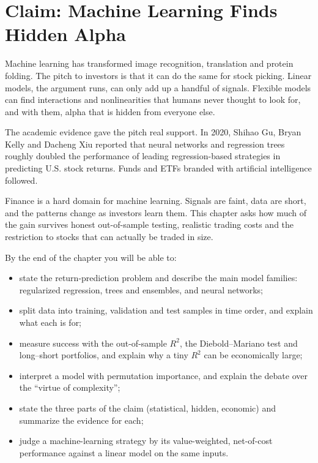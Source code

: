 \makeatletter
{}
\makeatother

\chapter{Claim: Machine Learning Finds Hidden Alpha}
\label{ch:21}

Machine learning has transformed image recognition, translation and protein folding. The pitch to investors is that it can do the same for stock picking. Linear models, the argument runs, can only add up a handful of signals. Flexible models can find interactions and nonlinearities that humans never thought to look for, and with them, alpha that is hidden from everyone else.

The academic evidence gave the pitch real support. In 2020, Shihao Gu, Bryan Kelly and Dacheng Xiu reported that neural networks and regression trees roughly doubled the performance of leading regression-based strategies in predicting U.S. stock returns. Funds and ETFs branded with artificial intelligence followed.

Finance is a hard domain for machine learning. Signals are faint, data are short, and the patterns change as investors learn them. This chapter asks how much of the gain survives honest out-of-sample testing, realistic trading costs and the restriction to stocks that can actually be traded in size.

By the end of the chapter you will be able to:

\begin{itemize}
  \item state the return-prediction problem and describe the main model families: regularized regression, trees and ensembles, and neural networks;
  \item split data into training, validation and test samples in time order, and explain what each is for;
  \item measure success with the out-of-sample $R^2$, the Diebold--Mariano test and long--short portfolios, and explain why a tiny $R^2$ can be economically large;
  \item interpret a model with permutation importance, and explain the debate over the ``virtue of complexity'';
  \item state the three parts of the claim (statistical, hidden, economic) and summarize the evidence for each;
  \item judge a machine-learning strategy by its value-weighted, net-of-cost performance against a linear model on the same inputs.
\end{itemize}

